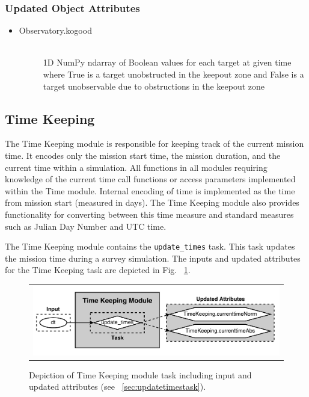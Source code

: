\documentclass[cleanfoot]{asme2ej}
\begin{document}
\subsubsection*{Updated Object Attributes}
\begin{itemize}
    \item 
    \begin{description}
        \item[Observatory.kogood] \hfill \\
        1D NumPy ndarray of Boolean values for each target at given time where True is a target unobstructed in the keepout zone and False is a target unobservable due to obstructions in the keepout zone
    \end{description}
\end{itemize}


\subsection{Time Keeping} \label{sec:time}
The Time Keeping module is responsible for keeping track of the current mission time.  It encodes only the mission start time, the mission duration, and the current time within a simulation.  All functions in all modules requiring knowledge of the current time call functions or access parameters implemented within the Time module.  Internal encoding of time is implemented as the time from mission start (measured in days).  The Time Keeping module also provides functionality for converting between this time measure and standard measures such as Julian Day Number and UTC time.

The Time Keeping module contains the \verb+update_times+ task.  This task updates the mission time during a survey simulation.  The inputs and updated attributes for the Time Keeping task are depicted in Fig. ~\ref{fig:timekeepingmodule}.

\begin{figure}[ht]
    \begin{center}
        \begin{tabular}{c}
             \includegraphics[width=\textwidth]{TimeKeepingTasks}
        \end{tabular}
    \end{center}
    \caption{\label{fig:timekeepingmodule} Depiction of Time Keeping module task including input and updated attributes (see ~\ref{sec:updatetimestask}).}
\end{figure}
\end{document}
